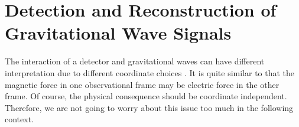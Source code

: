 

\section{Detection and Reconstruction of Gravitational Wave Signals}
The interaction of a detector and gravitational waves can have different interpretation due to different coordinate choices \cite{ifo:gauge}. It is quite similar to that the magnetic force in one observational frame may be electric force in the other frame. Of course, the physical consequence should be coordinate independent. Therefore, we are not going to worry about this issue too much in the following context.

